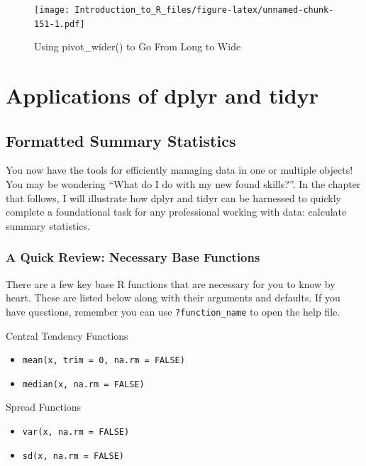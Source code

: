 \documentclass[]{book}
\providecommand{\tightlist}{%
  \setlength{\itemsep}{0pt}\setlength{\parskip}{0pt}}
\theoremstyle{definition}
\theoremstyle{definition}
\theoremstyle{definition}
\theoremstyle{remark}
\begin{document}
\begin{figure}
\centering
\texttt{[image: Introduction\_to\_R\_files/figure-latex/unnamed-chunk-151-1.pdf]}
\caption{\label{fig:unnamed-chunk-151}Using pivot\_wider() to Go From Long to Wide}
\end{figure}

\hypertarget{part-applications-of-dplyr-and-tidyr}{%
\part{Applications of dplyr and tidyr}\label{part-applications-of-dplyr-and-tidyr}}

\hypertarget{formatted-summary-statistics}{%
\chapter{Formatted Summary Statistics}\label{formatted-summary-statistics}}

You now have the tools for efficiently managing data in one or multiple objects! You may be wondering ``What do I do with my new found skills?''. In the chapter that follows, I will illustrate how dplyr and tidyr can be harnessed to quickly complete a foundational task for any professional working with data: calculate summary statistics.

\hypertarget{a-quick-review-necessary-base-functions}{%
\section{A Quick Review: Necessary Base Functions}\label{a-quick-review-necessary-base-functions}}

There are a few key base R functions that are necessary for you to know by heart. These are listed below along with their arguments and defaults. If you have questions, remember you can use \texttt{?function\_name} to open the help file.

Central Tendency Functions

\begin{itemize}
\tightlist
\item
  \texttt{mean(x,\ trim\ =\ 0,\ na.rm\ =\ FALSE)}
\item
  \texttt{median(x,\ na.rm\ =\ FALSE)}
\end{itemize}

Spread Functions

\begin{itemize}
\tightlist
\item
  \texttt{var(x,\ na.rm\ =\ FALSE)}
\item
  \texttt{sd(x,\ na.rm\ =\ FALSE)}
\end{itemize}
\end{document}
